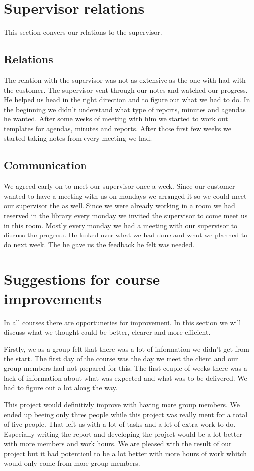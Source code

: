  \section{Supervisor relations}
This section convers our relations to the supervisor. 
\subsection{Relations}
The relation with the supervisor was not as extensive as the one with had with the customer.
The supervisor vent through our notes and watched our progress.
He helped us head in the right direction and to figure out what we had to do.
In the beginning we didn't understand what type of reports, minutes and agendas he wanted. 
After some weeks of meeting with him we started to work out templates  for agendas, minutes and reports. 
After those first few weeks we started taking notes from every meeting we had.

\subsection{Communication}
We agreed early on to meet our supervisor once a week. 
Since our customer wanted to have a meeting with us on mondays we arranged it so we could meet our supervisor the as well.
Since we were already working in a room we had reserved in the library every monday we invited the supervisor to come meet us in this room.
Mostly every monday we had a meeting with our supervisor to discuss the progress.
He looked over what we had done and what we planned to do next week.
The he gave us the feedback he felt was needed.
 

\section{Suggestions for course improvements}
In all courses there are opportuneties for improvement.
In this section we will discuss what we thought could be better, clearer and more efficient.

Firstly, we as a group felt that there was a lot of information we didn't get from the start. 
The first day of the course was the day we meet the client and our group members had not prepared for this.
The first couple of weeks there was a lack of information about what was expected and what was to be delivered.
We had to figure out a lot along the way.

This project would definitivly improve with having more group members. 
We ended up beeing only three people while this project was really ment for a total of five people.
That left us with a lot of tasks and a lot of extra work to do.
Especially writing the report and developing the project would be a lot better with more members and work hours. 
We are pleased with the result of our project but it had potentionl to be a lot better with more hours of work whitch would only come from more group members. 

